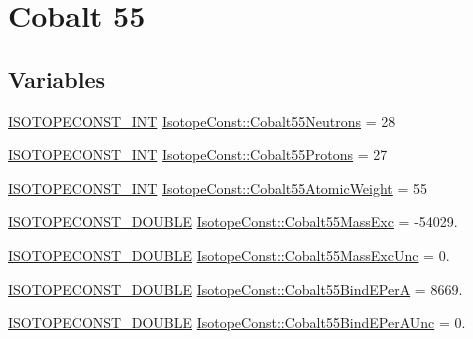\hypertarget{group___isotope_const-_cobalt-_co55}{}\section{Cobalt 55}
\label{group___isotope_const-_cobalt-_co55}
\subsection*{Variables}
\begin{DoxyCompactItemize}
\item 
\mbox{\hyperlink{group___isotope_const-_macros_ga5f18360b3e99483a35c32d789e62621c}{I\+S\+O\+T\+O\+P\+E\+C\+O\+N\+S\+T\+\_\+\+I\+NT}} \mbox{\hyperlink{group___isotope_const-_cobalt-_co55_gae834a1305e4e55b631e95e3d665d5822}{Isotope\+Const\+::\+Cobalt55\+Neutrons}} = 28
\item 
\mbox{\hyperlink{group___isotope_const-_macros_ga5f18360b3e99483a35c32d789e62621c}{I\+S\+O\+T\+O\+P\+E\+C\+O\+N\+S\+T\+\_\+\+I\+NT}} \mbox{\hyperlink{group___isotope_const-_cobalt-_co55_ga7a2118d5ed140cf25a6137fe45f10246}{Isotope\+Const\+::\+Cobalt55\+Protons}} = 27
\item 
\mbox{\hyperlink{group___isotope_const-_macros_ga5f18360b3e99483a35c32d789e62621c}{I\+S\+O\+T\+O\+P\+E\+C\+O\+N\+S\+T\+\_\+\+I\+NT}} \mbox{\hyperlink{group___isotope_const-_cobalt-_co55_ga79d96adf43bd9c67955580026d0fa4ec}{Isotope\+Const\+::\+Cobalt55\+Atomic\+Weight}} = 55
\item 
\mbox{\hyperlink{group___isotope_const-_macros_ga8f45a7272ce02c0b4c65c44636ed719a}{I\+S\+O\+T\+O\+P\+E\+C\+O\+N\+S\+T\+\_\+\+D\+O\+U\+B\+LE}} \mbox{\hyperlink{group___isotope_const-_cobalt-_co55_gae88e0d106d43852840bcaa8a8314bf8b}{Isotope\+Const\+::\+Cobalt55\+Mass\+Exc}} = -\/54029.
\item 
\mbox{\hyperlink{group___isotope_const-_macros_ga8f45a7272ce02c0b4c65c44636ed719a}{I\+S\+O\+T\+O\+P\+E\+C\+O\+N\+S\+T\+\_\+\+D\+O\+U\+B\+LE}} \mbox{\hyperlink{group___isotope_const-_cobalt-_co55_ga5ee5251dad205d47233af94d96363ab4}{Isotope\+Const\+::\+Cobalt55\+Mass\+Exc\+Unc}} = 0.
\item 
\mbox{\hyperlink{group___isotope_const-_macros_ga8f45a7272ce02c0b4c65c44636ed719a}{I\+S\+O\+T\+O\+P\+E\+C\+O\+N\+S\+T\+\_\+\+D\+O\+U\+B\+LE}} \mbox{\hyperlink{group___isotope_const-_cobalt-_co55_gab8e115148d63812e9b6c649a667d2aa3}{Isotope\+Const\+::\+Cobalt55\+Bind\+E\+PerA}} = 8669.
\item 
\mbox{\hyperlink{group___isotope_const-_macros_ga8f45a7272ce02c0b4c65c44636ed719a}{I\+S\+O\+T\+O\+P\+E\+C\+O\+N\+S\+T\+\_\+\+D\+O\+U\+B\+LE}} \mbox{\hyperlink{group___isotope_const-_cobalt-_co55_ga3dfa99ca33c1ceb08e86876e99ad3010}{Isotope\+Const\+::\+Cobalt55\+Bind\+E\+Per\+A\+Unc}} = 0.

\end{DoxyCompactItemize}

